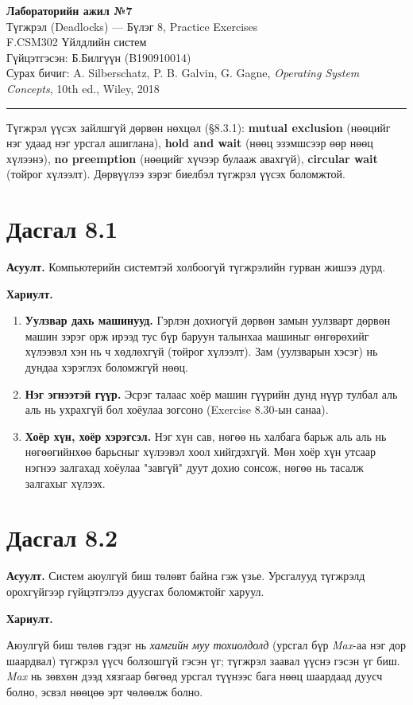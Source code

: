 \documentclass[12pt,a4paper]{article}
\newcommand{\question}[2]{\section{Дасгал #1}\textbf{Асуулт.} #2\par\medskip\textbf{Хариулт.}\par}
\begin{document}
\begin{center}
  {\Large\bfseries Лабораторийн ажил №7}\\[0.4em]
  {\large Түгжрэл (Deadlocks) — Бүлэг 8, Practice Exercises}\\[0.8em]
  F.CSM302 Үйлдлийн систем\\
  Гүйцэтгэсэн: Б.Билгүүн (B190910014)\\[0.3em]
  Сурах бичиг: A. Silberschatz, P. B. Galvin, G. Gagne, \textit{Operating System Concepts}, 10th ed., Wiley, 2018
\end{center}
\hrule
\bigskip

Түгжрэл үүсэх зайлшгүй дөрвөн нөхцөл (§8.3.1): \textbf{mutual exclusion} (нөөцийг нэг удаад нэг урсгал ашиглана), \textbf{hold and wait} (нөөц эзэмшсээр өөр нөөц хүлээнэ), \textbf{no preemption} (нөөцийг хүчээр булааж авахгүй), \textbf{circular wait} (тойрог хүлээлт). Дөрвүүлээ зэрэг биелбэл түгжрэл үүсэх боломжтой.

\question{8.1}{Компьютерийн системтэй холбоогүй түгжрэлийн гурван жишээ дурд.}

\begin{enumerate}[leftmargin=1.5em]
  \item \textbf{Уулзвар дахь машинууд.} Гэрлэн дохиогүй дөрвөн замын уулзварт дөрвөн машин зэрэг орж ирээд тус бүр баруун талынхаа машиныг өнгөрөхийг хүлээвэл хэн нь ч хөдлөхгүй (тойрог хүлээлт). Зам (уулзварын хэсэг) нь дундаа хэрэглэх боломжгүй нөөц.
  \item \textbf{Нэг эгнээтэй гүүр.} Эсрэг талаас хоёр машин гүүрийн дунд нүүр тулбал аль аль нь ухрахгүй бол хоёулаа зогсоно (Exercise 8.30-ын санаа).
  \item \textbf{Хоёр хүн, хоёр хэрэгсэл.} Нэг хүн сав, нөгөө нь халбага барьж аль аль нь нөгөөгийнхөө барьсныг хүлээвэл хоол хийгдэхгүй. Мөн хоёр хүн утсаар нэгнээ залгахад хоёулаа "завгүй" дуут дохио сонсож, нөгөө нь тасалж залгахыг хүлээх.
\end{enumerate}

\question{8.2}{Систем аюулгүй биш төлөвт байна гэж үзье. Урсгалууд түгжрэлд орохгүйгээр гүйцэтгэлээ дуусгах боломжтойг харуул.}

Аюулгүй биш төлөв гэдэг нь \emph{хамгийн муу тохиолдолд} (урсгал бүр \textit{Max}-аа нэг дор шаардвал) түгжрэл үүсч болзошгүй гэсэн үг; түгжрэл заавал үүснэ гэсэн үг биш. \textit{Max} нь зөвхөн дээд хязгаар бөгөөд урсгал түүнээс бага нөөц шаардаад дуусч болно, эсвэл нөөцөө эрт чөлөөлж болно.
\end{document}
